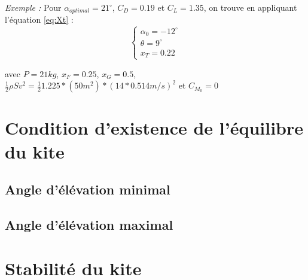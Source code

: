 \documentclass[conference]{IEEEtran}
\begin{document}
\textit{Exemple : }
Pour $\alpha_{optimal} = 21^\circ$, $C_D = 0.19$ et $C_L = 1.35$, on trouve en appliquant l'équation \ref{eq:Xt} : \\

\begin{equation}
    \begin{cases}
    \alpha_0 =  -12^\circ\\
    \theta = 9^\circ\\
    x_T = 0.22
    \end{cases}
    \label{eq:Xt results}
\end{equation}

avec $P = 21 kg$, $x_F = 0.25$, $x_G = 0.5$,$\frac{1}{2} \rho S v^2 = \frac{1}{2} 1.225 * (50m^2) * (14 * 0.514 m/s)^2$  et $C_{M_0} = 0$

\IEEEpeerreviewmaketitle
\section{Condition d'existence de l'équilibre du kite }

\subsection{Angle d'élévation minimal} 


\subsection{Angle d'élévation maximal}

\section{Stabilité du kite }
\end{document}
